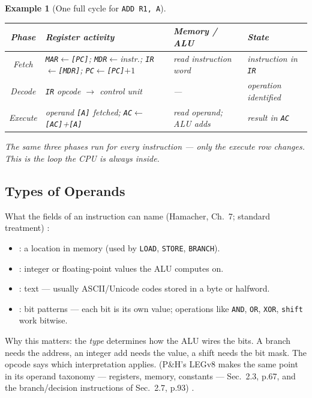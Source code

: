 \documentclass[11pt]{article}
\newtheorem{example}{Example}[section]
\begin{document}
\begin{example}[One full cycle for \texttt{ADD R1, A}]
\begin{center}
\small
\begin{tabular}{@{}cp{3.4cm}p{3.6cm}p{3.4cm}@{}}
\toprule
\textbf{Phase} & \textbf{Register activity} & \textbf{Memory / ALU} & \textbf{State} \\
\midrule
Fetch &
  \texttt{MAR}$\gets$\texttt{[PC]}; \texttt{MDR}$\gets$instr.; \texttt{IR}$\gets$\texttt{[MDR]}; \texttt{PC}$\gets$\texttt{[PC]}$+1$ &
  read instruction word &
  instruction in \texttt{IR} \\
Decode &
  \texttt{IR} opcode $\to$ control unit &
  --- &
  operation identified \\
Execute &
  operand \texttt{[A]} fetched; \texttt{AC}$\gets$\texttt{[AC]}+\texttt{[A]} &
  read operand; ALU adds &
  result in \texttt{AC} \\
\bottomrule
\end{tabular}
\end{center}
The same three phases run for every instruction --- only the execute row changes. This is the loop the CPU is always inside.
\end{example}

\subsection{Types of Operands}

What the fields of an instruction can name (Hamacher, Ch.~7; standard treatment) \cite{Hamacher2002_computer_organization}:
\begin{itemize}
  \item {}: a location in memory (used by \texttt{LOAD}, \texttt{STORE}, \texttt{BRANCH}).
  \item {}: integer or floating-point values the ALU computes on.
  \item {}: text --- usually ASCII/Unicode codes stored in a byte or halfword.
  \item {}: bit patterns --- each bit is its own value; operations like \texttt{AND}, \texttt{OR}, \texttt{XOR}, \texttt{shift} work bitwise.
\end{itemize}

Why this matters: the \emph{type} determines how the ALU wires the bits. A branch needs the address, an integer add needs the value, a shift needs the bit mask. The opcode says which interpretation applies. (P\&H's LEGv8 makes the same point in its operand taxonomy --- registers, memory, constants --- Sec.~2.3, p.67, and the branch/decision instructions of Sec.~2.7, p.93) \cite{PattersonHennessy2017_computer_organization_design}.
\end{document}
